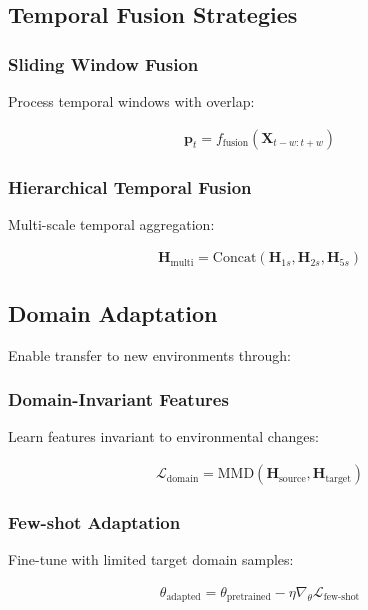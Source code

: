 \documentclass[journal]{IEEEtran}
\begin{document}
\subsection{Temporal Fusion Strategies}

\subsubsection{Sliding Window Fusion}

Process temporal windows with overlap:

\begin{align}
\mathbf{p}_t = f_{\text{fusion}}(\mathbf{X}_{t-w:t+w})
\end{align}

\subsubsection{Hierarchical Temporal Fusion}

Multi-scale temporal aggregation:

\begin{align}
\mathbf{H}_{\text{multi}} = \text{Concat}(\mathbf{H}_{1s}, \mathbf{H}_{2s}, \mathbf{H}_{5s})
\end{align}

\subsection{Domain Adaptation}

Enable transfer to new environments through:

\subsubsection{Domain-Invariant Features}

Learn features invariant to environmental changes:

\begin{align}
\mathcal{L}_{\text{domain}} = \text{MMD}(\mathbf{H}_{\text{source}}, \mathbf{H}_{\text{target}})
\end{align}

\subsubsection{Few-shot Adaptation}

Fine-tune with limited target domain samples:

\begin{align}
\theta_{\text{adapted}} = \theta_{\text{pretrained}} - \eta \nabla_{\theta} \mathcal{L}_{\text{few-shot}}
\end{align}
\end{document}
